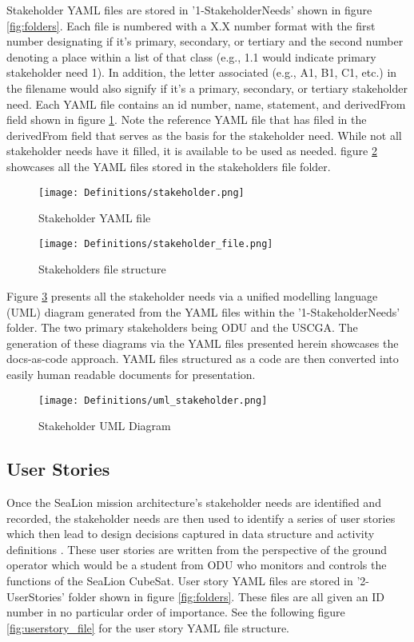 \documentclass[journal,article,submit,pdftex,moreauthors]{Definitions/mdpi}
\begin{document}
Stakeholder YAML files are stored in '1-StakeholderNeeds' shown in figure \ref{fig:folders}.  Each file is numbered with a X.X number format with the first number designating if it's primary, secondary, or tertiary and the second number denoting a place within a list of that class (e.g., 1.1 would indicate primary stakeholder need 1).  In addition, the letter associated (e.g., A1, B1, C1, etc.) in the filename would also signify if it's a primary, secondary, or tertiary stakeholder need. Each YAML file contains an id number, name, statement, and derivedFrom field shown in figure \ref{fig:stakeholder_yaml}.  Note the reference YAML file that has filed in the derivedFrom field that serves as the basis for the stakeholder need.  While not all stakeholder needs have it filled, it is available to be used as needed.  figure \ref{fig:stakeholder_file} showcases all the YAML files stored in the stakeholders file folder.

\begin{figure}[H]
    \texttt{[image: Definitions/stakeholder.png]}
    \caption{Stakeholder YAML file}
	\label{fig:stakeholder_yaml}
    \end{figure}   
\unskip

\begin{figure}[H]
    \texttt{[image: Definitions/stakeholder\_file.png]}
    \caption{Stakeholders file structure}
	\label{fig:stakeholder_file}
    \end{figure}
	\noindent   
\unskip

Figure \ref{fig:uml_stakeholder} presents all the stakeholder needs via a unified modelling language (UML) diagram generated from the YAML files within the '1-StakeholderNeeds' folder.  The two primary stakeholders being ODU and the USCGA.  The generation of these diagrams via the YAML files presented herein showcases the docs-as-code approach.  YAML files structured as a code are then converted into easily human readable documents for presentation.

\begin{figure}[H]
    \texttt{[image: Definitions/uml\_stakeholder.png]}
    \caption{Stakeholder UML Diagram}
	\label{fig:uml_stakeholder}
    \end{figure}   
\unskip

\subsection{User Stories}
Once the SeaLion mission architecture's stakeholder needs are identified and recorded, the stakeholder needs are then used to identify a series of user stories which then lead to design decisions captured in data structure and activity definitions \cite{sealion_page}.  These user stories are written from the perspective of the ground operator which would be a student from ODU who monitors and controls the functions of the SeaLion CubeSat.  User story YAML files are stored in '2-UserStories' folder shown in figure \ref{fig:folders}.  These files are all given an ID number in no particular order of importance.  See the following figure \ref{fig:userstory_file} for the user story YAML file structure.
\end{document}
